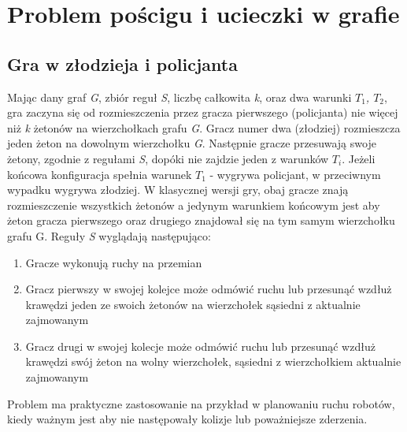 \documentclass[brudnopis]{xmgr}
\newtheorem{Twierdzenie}{Twierdzenie}
\begin{document}
\chapter{Problem pościgu i ucieczki w grafie}
\section{Gra w złodzieja i policjanta}
Mając dany graf \textit{G}, zbiór reguł \textit{S}, liczbę całkowita \textit{k}, oraz dwa warunki \textit{$T_1$, $T_2$}, gra zaczyna się od rozmieszczenia przez gracza pierwszego (policjanta) nie więcej niż \textit{k} żetonów na wierzchołkach grafu \textit{G}. Gracz numer dwa (złodziej) rozmieszcza jeden żeton na dowolnym wierzchołku \textit{G}. Następnie gracze przesuwają swoje żetony, zgodnie z regułami \textit{S}, dopóki nie zajdzie jeden z warunków $T_i$. Jeżeli końcowa konfiguracja spełnia warunek $T_1$ - wygrywa policjant, w przeciwnym wypadku wygrywa złodziej. W klasycznej wersji gry, obaj gracze znają rozmieszczenie wszystkich żetonów a jedynym warunkiem końcowym jest aby żeton gracza pierwszego oraz drugiego znajdował się na tym samym wierzchołku grafu G.
Reguły \textit{S} wyglądają następująco:
\begin{enumerate}
  \item Gracze wykonują ruchy na przemian
  \item Gracz pierwszy w swojej kolejce może odmówić ruchu lub przesunąć wzdłuż krawędzi jeden ze swoich żetonów na wierzchołek sąsiedni z aktualnie zajmowanym
  \item Gracz drugi w swojej kolecje może odmówić ruchu lub przesunąć wzdłuż krawędzi swój żeton na wolny wierzchołek, sąsiedni z wierzchołkiem aktualnie zajmowanym
\end{enumerate}

Problem ma praktyczne zastosowanie na przykład w planowaniu ruchu robotów, kiedy ważnym jest aby nie następowały kolizje lub poważniejsze zderzenia.
\end{document}
